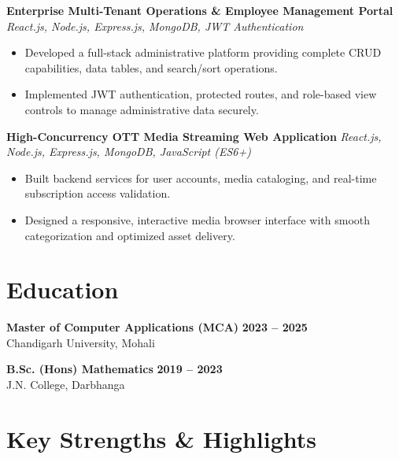 \documentclass[a4paper,10pt]{article}
\begin{document}
\textbf{Enterprise Multi-Tenant Operations \& Employee Management Portal}
\hfill
\textit{React.js, Node.js, Express.js, MongoDB, JWT Authentication}

\begin{itemize}

    \item Developed a full-stack administrative platform providing complete CRUD capabilities, data tables, and search/sort operations.

    \item Implemented JWT authentication, protected routes, and role-based view controls to manage administrative data securely.

\end{itemize}


\textbf{High-Concurrency OTT Media Streaming Web Application}
\hfill
\textit{React.js, Node.js, Express.js, MongoDB, JavaScript (ES6+)}

\begin{itemize}

    \item Built backend services for user accounts, media cataloging, and real-time subscription access validation.

    \item Designed a responsive, interactive media browser interface with smooth categorization and optimized asset delivery.

\end{itemize}

\section*{Education}

\textbf{Master of Computer Applications (MCA)}
\hfill
\textbf{2023 -- 2025}
\\
Chandigarh University, Mohali

\vspace{3pt}

\textbf{B.Sc. (Hons) Mathematics}
\hfill
\textbf{2019 -- 2023}
\\
J.N. College, Darbhanga

\section*{Key Strengths \& Highlights}
\end{document}

